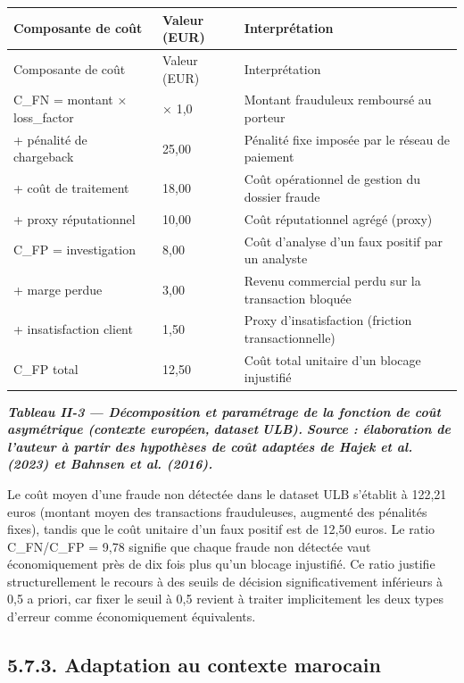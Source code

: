 \begin{longtable}{|p{}|p{}|p{}|}
\hline
Composante de coût & Valeur (EUR) & Interprétation \\
\hline
\endfirsthead
\hline
Composante de coût & Valeur (EUR) & Interprétation \\
\hline
\endhead
C\_FN = montant × loss\_factor & × 1,0 & Montant frauduleux remboursé au porteur \\
\hline
+ pénalité de chargeback & 25,00 & Pénalité fixe imposée par le réseau de paiement \\
\hline
+ coût de traitement & 18,00 & Coût opérationnel de gestion du dossier fraude \\
\hline
+ proxy réputationnel & 10,00 & Coût réputationnel agrégé (proxy) \\
\hline
C\_FP = investigation & 8,00 & Coût d'analyse d'un faux positif par un analyste \\
\hline
+ marge perdue & 3,00 & Revenu commercial perdu sur la transaction bloquée \\
\hline
+ insatisfaction client & 1,50 & Proxy d'insatisfaction (friction transactionnelle) \\
\hline
C\_FP total & 12,50 & Coût total unitaire d'un blocage injustifié \\
\hline
\end{longtable}

\textbf{\emph{Tableau II-}}\textbf{\emph{3}}\textbf{\emph{ — Décomposition et paramétrage de la fonction de coût asymétrique (contexte européen, }}\textbf{\emph{dataset}}\textbf{\emph{ ULB).}}\textbf{ }\textbf{\emph{Source : élaboration de l'auteur à partir des hypothèses de coût adaptées de Hajek et al. (2023) et Bahnsen et al. (2016).}}

Le coût moyen d'une fraude non détectée dans le dataset ULB s'établit à 122,21 euros (montant moyen des transactions frauduleuses, augmenté des pénalités fixes), tandis que le coût unitaire d'un faux positif est de 12,50 euros. Le ratio C\_FN/C\_FP = 9,78 signifie que chaque fraude non détectée vaut économiquement près de dix fois plus qu'un blocage injustifié. Ce ratio justifie structurellement le recours à des seuils de décision significativement inférieurs à 0,5 a priori, car fixer le seuil à 0,5 revient à traiter implicitement les deux types d'erreur comme économiquement équivalents.

\subsection{5.7.3. Adaptation au contexte marocain}

